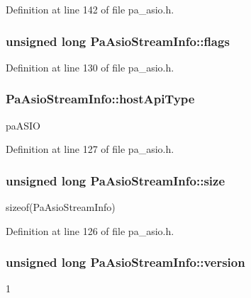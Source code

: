 Definition at line 142 of file pa\+\_\+asio.\+h.

\subsubsection[{\texorpdfstring{flags}{flags}}]{\setlength{\rightskip}{0pt plus 5cm}unsigned long Pa\+Asio\+Stream\+Info\+::flags}\hypertarget{struct_pa_asio_stream_info_abcf467d6508d8fbcb4ddbe95d17669f4}{}\label{struct_pa_asio_stream_info_abcf467d6508d8fbcb4ddbe95d17669f4}


Definition at line 130 of file pa\+\_\+asio.\+h.

\subsubsection[{\texorpdfstring{host\+Api\+Type}{hostApiType}}]{ Pa\+Asio\+Stream\+Info\+::host\+Api\+Type}\hypertarget{struct_pa_asio_stream_info_aa89dc033f30cd1549d33f44074c79358}{}\label{struct_pa_asio_stream_info_aa89dc033f30cd1549d33f44074c79358}
pa\+A\+S\+IO 

Definition at line 127 of file pa\+\_\+asio.\+h.

\subsubsection[{\texorpdfstring{size}{size}}]{\setlength{\rightskip}{0pt plus 5cm}unsigned long Pa\+Asio\+Stream\+Info\+::size}\hypertarget{struct_pa_asio_stream_info_a64b7653dba1527f04b9d1ab3b642687e}{}\label{struct_pa_asio_stream_info_a64b7653dba1527f04b9d1ab3b642687e}
sizeof(\+Pa\+Asio\+Stream\+Info) 

Definition at line 126 of file pa\+\_\+asio.\+h.

\subsubsection[{\texorpdfstring{version}{version}}]{\setlength{\rightskip}{0pt plus 5cm}unsigned long Pa\+Asio\+Stream\+Info\+::version}\hypertarget{struct_pa_asio_stream_info_a1399d6368fe7cfd3297667c1140a24a0}{}\label{struct_pa_asio_stream_info_a1399d6368fe7cfd3297667c1140a24a0}
1 

